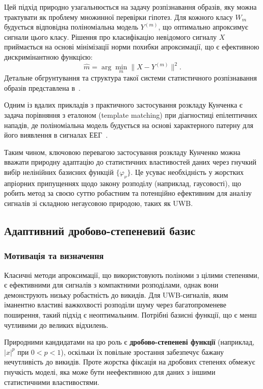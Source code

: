 \documentclass[12pt,a4paper]{article}
\begin{document}
Цей підхід природно узагальнюється на задачу розпізнавання образів, яку можна трактувати як проблему множинної перевірки гіпотез. Для кожного класу $W_m$ будується відповідна поліноміальна модель $Y^{(m)}$, що оптимально апроксимує сигнали цього класу. Рішення про класифікацію невідомого сигналу $X$ приймається на основі мінімізації норми похибки апроксимації, що є ефективною дискримінантною функцією:
\begin{equation}
	\hat{m} = \arg\min_{m} \|X - Y^{(m)}\|^2.
\end{equation}
Детальне обгрунтування та структура такої системи статистичного розпізнавання образів представлена в~\cite{zabolotnii2009statistical}.

Одним із вдалих прикладів з практичного застосування розкладу Кунченка є задача порівняння з еталоном (template matching) при діагностиці епілептичних нападів, де поліноміальна модель будується на основі характерного патерну для його виявлення в сигналах ЕЕГ~\cite{chertov2014epileptic}.

Таким чином, ключовою перевагою застосування розкладу Кунченко можна вважати природну адаптацію до статистичних властивостей даних через гнучкий вибір нелінійних базисних функцій $\{\varphi_\nu\}$. Це усуває необхідність у жорстких апріорних припущеннях щодо закону розподілу (наприклад, гаусовості), що робить метод за своєю суттю робастним та потенційно ефективним для аналізу сигналів зі складною негаусовою природою, таких як UWB.

\subsection{Адаптивний дробово-степеневий базис}

\subsubsection{Мотивація та визначення}

Класичні методи апроксимації, що використовують поліноми з цілими степенями, є ефективними для сигналів з компактними розподілами, однак вони демонструють низьку робастність до викидів. Для UWB-сигналів, яким іманентно властиві важкохвості розподіли шуму через багатопроменеве поширення, такий підхід є неоптимальним. Потрібні базисні функції, що є менш чутливими до великих відхилень.

Природними кандидатами на цю роль є \textbf{дробово-степеневі функції} (наприклад, $|x|^p$ при $0 < p < 1$), оскільки їх повільне зростання забезпечує бажану нечутливість до викидів. Проте жорстка фіксація на дробових степенях обмежує гнучкість моделі, яка може бути неефективною для даних з іншими статистичними властивостями.
\end{document}
